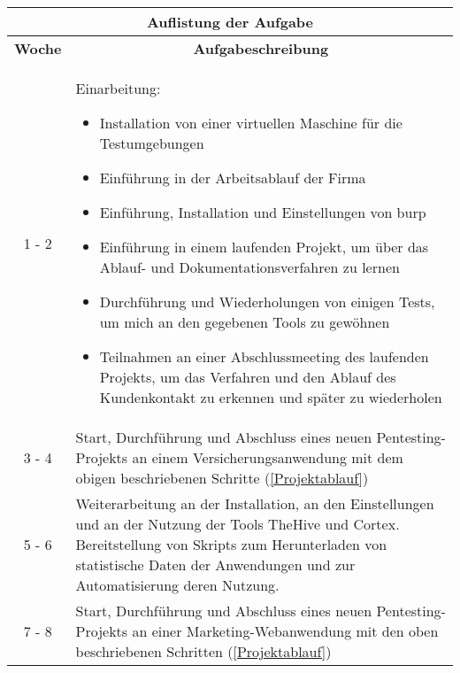\begin{table}[H]
    \begin{tabularx}{\textwidth}{|c|X|}
    \toprule
    \multicolumn{2}{c}{\textbf{Auflistung der Aufgabe}} \\
    \midrule
    \multicolumn{1}{c}{\textbf{Woche}} & \multicolumn{1}{c}{\textbf{Aufgabeschreibung}} \\
    \hline
    1 - 2    & Einarbeitung:
                \begin{itemize}
                    \item Installation von einer virtuellen Maschine für die Testumgebungen
                    \item Einführung in der Arbeitsablauf der Firma
                    \item Einführung, Installation und Einstellungen von \gls{burp}
                    \item Einführung in einem laufenden Projekt, um über das Ablauf- und Dokumentationsverfahren zu lernen
                    \item Durchführung und Wiederholungen von einigen Tests, um mich an den gegebenen Tools zu gewöhnen
                    \item Teilnahmen an einer Abschlussmeeting des laufenden Projekts, um das Verfahren und den Ablauf des Kundenkontakt zu erkennen und später zu wiederholen
                \end{itemize} \\
        \hline

    3 - 4       &  Start, Durchführung und Abschluss eines neuen Pentesting-Projekts an einem Versicherungsanwendung mit dem obigen beschriebenen Schritte (\ref{Projektablauf})  \\ 
    
    \hline

    5 - 6       & Weiterarbeitung an der Installation, an den Einstellungen und an der Nutzung der Tools \gls{TheHive} und \gls{Cortex}. Bereitstellung von Skripts zum Herunterladen von statistische Daten der Anwendungen und zur Automatisierung deren Nutzung.  \\ 

    \hline

    7 - 8      &  Start, Durchführung und Abschluss eines neuen Pentesting-Projekts an einer Marketing-Webanwendung mit den oben beschriebenen Schritten (\ref{Projektablauf}) \\

    \hline


\end{tabularx}
\end{table}
